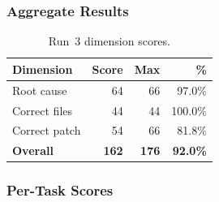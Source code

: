 \subsubsection{Aggregate Results}

\begin{table}[h]
\centering
\caption{Run~3 dimension scores.}\label{tab:r3-dim}
\begin{tabular}{lrrr}
\toprule
\textbf{Dimension} & \textbf{Score} & \textbf{Max} & \textbf{\%} \\
\midrule
Root cause         & 64 & 66 & 97.0\% \\
Correct files      & 44 & 44 & 100.0\% \\
Correct patch      & 54 & 66 & 81.8\% \\
\midrule
\textbf{Overall}   & \textbf{162} & \textbf{176} & \textbf{92.0\%} \\
\bottomrule
\end{tabular}
\end{table}

\subsubsection{Per-Task Scores}

